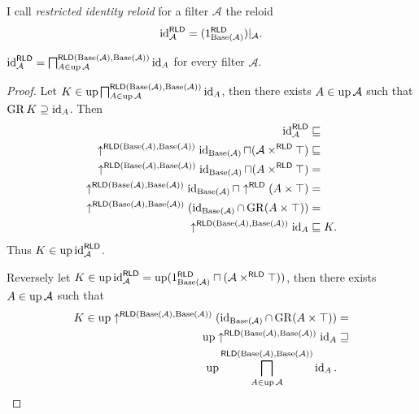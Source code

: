 \begin{defn}
I call \emph{restricted identity
reloid} for a filter $\mathcal{A}$ the reloid
\[
\operatorname{id}_{\mathcal{A}}^{\mathsf{RLD}}=(1_{\operatorname{Base}(\mathcal{A})}^{\mathsf{RLD}})|_{\mathcal{A}}.
\]
\end{defn}
\begin{thm}
$\operatorname{id}_{\mathcal{A}}^{\mathsf{RLD}}=\bigsqcap_{A\in\operatorname{up}\mathcal{A}}^{\mathsf{RLD}(\operatorname{Base}(\mathcal{A}),\operatorname{Base}(\mathcal{A}))}\operatorname{id}_{A}$
for every filter $\mathcal{A}$.\end{thm}
\begin{proof}
Let $K\in\operatorname{up}\bigsqcap_{A\in\operatorname{up}\mathcal{A}}^{\mathsf{RLD}(\operatorname{Base}(\mathcal{A}),\operatorname{Base}(\mathcal{A}))}\operatorname{id}_{A}$,
then there exists $A\in\operatorname{up}\mathcal{A}$ such that $\operatorname{GR} K\supseteq\operatorname{id}_{A}$.
Then
\begin{align*}
\operatorname{id}_{\mathcal{A}}^{\mathsf{RLD}} & \sqsubseteq\\
\uparrow^{\mathsf{RLD}(\operatorname{Base}(\mathcal{A}),\operatorname{Base}(\mathcal{A}))}\operatorname{id}_{\operatorname{Base}(\mathcal{A})}\sqcap(\mathcal{A}\times^{\mathsf{RLD}}\top) & \sqsubseteq\\
\uparrow^{\mathsf{RLD}(\operatorname{Base}(\mathcal{A}),\operatorname{Base}(\mathcal{A}))}\operatorname{id}_{\operatorname{Base}(\mathcal{A})}\sqcap(A\times^{\mathsf{RLD}}\top) & =\\
\uparrow^{\mathsf{RLD}(\operatorname{Base}(\mathcal{A}),\operatorname{Base}(\mathcal{A}))}\operatorname{id}_{\operatorname{Base}(\mathcal{A})}\sqcap\uparrow^{\mathsf{RLD}}(A\times\top) & =\\
\uparrow^{\mathsf{RLD}(\operatorname{Base}(\mathcal{A}),\operatorname{Base}(\mathcal{A}))}(\operatorname{id}_{\operatorname{Base}(\mathcal{A})}\cap\operatorname{GR}(A\times\top)) & =\\
\uparrow^{\mathsf{RLD}(\operatorname{Base}(\mathcal{A}),\operatorname{Base}(\mathcal{A}))}\operatorname{id}_{A} & \sqsubseteq K.
\end{align*}
Thus $K\in\operatorname{up}\operatorname{id}_{\mathcal{A}}^{\mathsf{RLD}}$.

Reversely let $K\in\operatorname{up}\operatorname{id}_{\mathcal{A}}^{\mathsf{RLD}}=\operatorname{up}(1_{\operatorname{Base}(\mathcal{A})}^{\mathsf{RLD}}\sqcap(\mathcal{A}\times^{\mathsf{RLD}}\top))$,
then there exists $A\in\operatorname{up}\mathcal{A}$ such that 
\begin{align*}
K\in\operatorname{up}\uparrow^{\mathsf{RLD}(\operatorname{Base}(\mathcal{A}),\operatorname{Base}(\mathcal{A}))}(\operatorname{id}_{\operatorname{Base}(\mathcal{A})}\cap\operatorname{GR}(A\times\top)) & =\\
\operatorname{up}\uparrow^{\mathsf{RLD}(\operatorname{Base}(\mathcal{A}),\operatorname{Base}(\mathcal{A}))}\operatorname{id}_{A} & \sqsupseteq\\
\operatorname{up}\bigsqcap_{A\in\operatorname{up}\mathcal{A}}^{\mathsf{RLD}(\operatorname{Base}(\mathcal{A}),\operatorname{Base}(\mathcal{A}))}\operatorname{id}_{A}.
\end{align*}
\end{proof}

